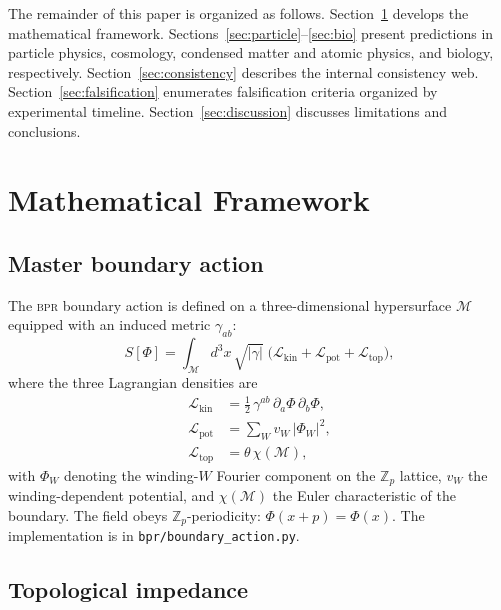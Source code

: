 \documentclass[aps,prd,twocolumn,superscriptaddress,longbibliography,nofootinbib]{revtex4-2}
\newcommand{\Zp}{\mathbb{Z}_p}
\newcommand{\bpr}{\textsc{bpr}}
\begin{document}
The remainder of this paper is organized as follows.
Section~\ref{sec:framework} develops the mathematical framework.
Sections~\ref{sec:particle}--\ref{sec:bio} present predictions in
particle physics, cosmology, condensed matter and atomic physics,
and biology, respectively.  Section~\ref{sec:consistency} describes
the internal consistency web.  Section~\ref{sec:falsification}
enumerates falsification criteria organized by experimental
timeline.  Section~\ref{sec:discussion} discusses limitations and
conclusions.


\section{Mathematical Framework}
\label{sec:framework}

\subsection{Master boundary action}

The \bpr{} boundary action is defined on a three-dimensional
hypersurface $\mathcal{M}$ equipped with an induced metric
$\gamma_{ab}$:
\begin{equation}
S[\Phi] = \int_{\mathcal{M}} \! d^3x \, \sqrt{|\gamma|} \;
\bigl( \mathcal{L}_{\mathrm{kin}} +
       \mathcal{L}_{\mathrm{pot}} +
       \mathcal{L}_{\mathrm{top}} \bigr),
\label{eq:master_action}
\end{equation}
where the three Lagrangian densities are
\begin{align}
\mathcal{L}_{\mathrm{kin}} &=
  \tfrac{1}{2}\, \gamma^{ab}\, \partial_a \Phi\, \partial_b \Phi,
  \label{eq:Lkin} \\
\mathcal{L}_{\mathrm{pot}} &=
  \sum_{W} v_W \, |\Phi_W|^2,
  \label{eq:Lpot} \\
\mathcal{L}_{\mathrm{top}} &=
  \theta\, \chi(\mathcal{M}),
  \label{eq:Ltop}
\end{align}
with $\Phi_W$ denoting the winding-$W$ Fourier component on the
$\Zp$ lattice, $v_W$ the winding-dependent potential, and
$\chi(\mathcal{M})$ the Euler characteristic of the boundary.  The
field obeys $\Zp$-periodicity: $\Phi(x + p) = \Phi(x)$.  The
implementation is in \texttt{bpr/boundary\_action.py}.

\subsection{Topological impedance}
\end{document}
